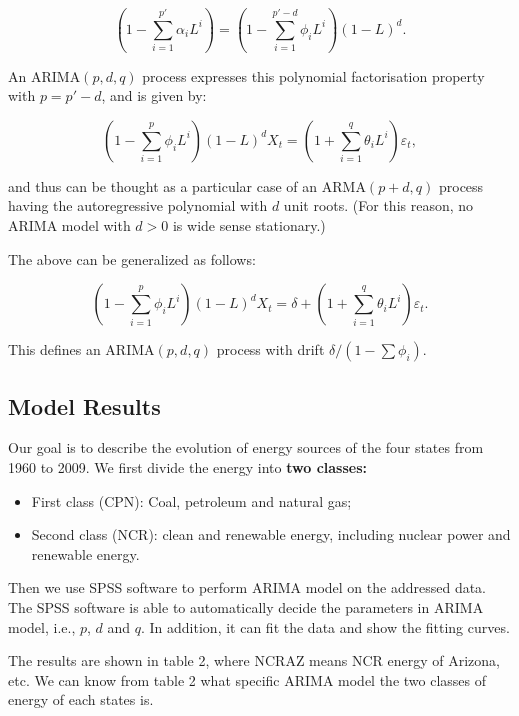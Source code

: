 \documentclass{mcmthesis}
\begin{document}
\begin{equation}\label{3}
\left(1-\sum _{i=1}^{p'}\alpha _{i}L^{i}\right)=\left(1-\sum _{i=1}^{p'-d}\phi _{i}L^{i}\right)\left(1-L\right)^{d}.
\end{equation}

An ARIMA$(p,d,q)$ process expresses this polynomial factorisation property with $p=p'-d$, and is given by:

\begin{equation}\label{4}
{\left(1-\sum _{i=1}^{p}\phi _{i}L^{i}\right)(1-L)^{d}X_{t}=\left(1+\sum _{i=1}^{q}\theta _{i}L^{i}\right)\varepsilon _{t},} 
\end{equation}

and thus can be thought as a particular case of an ARMA$(p+d,q)$ process having the autoregressive polynomial with $d$ unit roots. (For this reason, no ARIMA model with $d > 0$ is wide sense stationary.)

The above can be generalized as follows:

\begin{equation}\label{4}
{\left(1-\sum _{i=1}^{p}\phi _{i}L^{i}\right)(1-L)^{d}X_{t}=\delta +\left(1+\sum _{i=1}^{q}\theta _{i}L^{i}\right)\varepsilon _{t}.}
\end{equation}

This defines an ARIMA$(p,d,q)$ process with drift $\delta/\left(1-\sum\phi_i\right)$.

\subsection{Model Results}

Our goal is to describe the evolution of energy sources of the four states from 1960 to 2009. We first divide the energy into {\bf{two classes:}}
 
\begin{itemize}
\item First class (CPN): Coal, petroleum and natural gas;
\item Second class (NCR): clean and renewable energy, including nuclear power and renewable energy.
\end{itemize}

Then we use SPSS software to perform ARIMA model on the addressed data. The SPSS software is able to automatically decide the parameters in ARIMA model, i.e., $p$, $d$ and $q$. In addition, it can fit the data and show the fitting curves.

The results are shown in table 2, where NCRAZ means NCR energy of Arizona, etc. We can know from table 2 what specific ARIMA model the two classes of energy of each states is.
\end{document}
